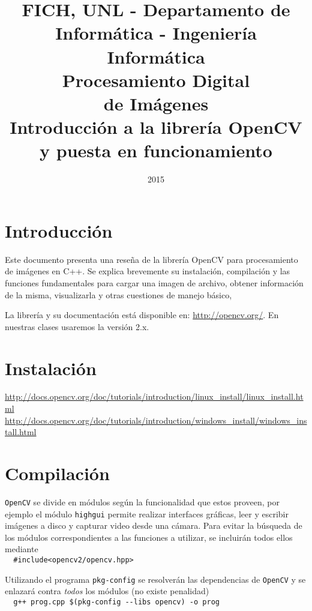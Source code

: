 \documentclass[11pt,a4paper,onecolumn]
{article}
\title{
	\small FICH, UNL - Departamento de Informática - Ingeniería Informática\\
	\vspace{0.5cm}
	\Large \bf{Procesamiento Digital}\\
	\bf{de Imágenes}\\
	\vspace{0.5cm}
	\normalsize Introducción a la librería OpenCV y puesta en funcionamiento\\
 }
\author{\small 2015}
\date{}
\newcommand{\tc}[1]{\texttt{#1}}
\begin{document}
	\maketitle

	\section{Introducción}
Este documento presenta una reseña de la librería OpenCV para procesamiento de imágenes en C++. Se explica brevemente su instalación, compilación y las funciones fundamentales para cargar una imagen de archivo, obtener información de la misma, visualizarla y otras cuestiones de manejo básico, 

La librería y su documentación está disponible en: \url{http://opencv.org/}. En nuestras clases usaremos la versión 2.x. %

	\section{Instalación}
\url{http://docs.opencv.org/doc/tutorials/introduction/linux_install/linux_install.html}\\
\url{http://docs.opencv.org/doc/tutorials/introduction/windows_install/windows_install.html}

	\section{Compilación}
\tc{OpenCV} se divide en módulos según la funcionalidad que estos proveen, por ejemplo el módulo \tc{highgui} permite realizar interfaces gráficas, leer y escribir imágenes a disco y capturar video desde una cámara.
Para evitar la búsqueda de los módulos correspondientes a las funciones a utilizar, se incluirán todos ellos mediante\\
\verb|  #include<opencv2/opencv.hpp>| %

Utilizando el programa \tc{pkg-config} se resolverán las dependencias de \tc{OpenCV} y se enlazará contra \emph{todos} los módulos (no existe penalidad)\\
\verb|  g++ prog.cpp $(pkg-config --libs opencv) -o prog|
\end{document}
